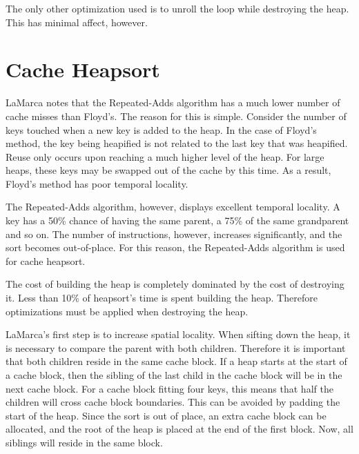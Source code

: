 The only other optimization used is to unroll the loop while destroying the
heap. This has minimal affect, however.

\section{Cache Heapsort}
\label{cache heapsort}
LaMarca notes that the Repeated-Adds algorithm has a much lower number of cache
misses than Floyd's. The reason for this is simple. Consider the number of keys 
touched when a new key is added to the heap. In the case of Floyd's method, the
key being heapified is not related to the last key that was heapified. Reuse
only occurs upon reaching a much higher level of the heap. For large heaps, these
keys may be swapped out of the cache by this time. As a result, Floyd's method
has poor temporal locality.

The Repeated-Adds algorithm, however, displays excellent temporal locality. A
key has a 50\% chance of having the same parent, a 75\% of the same grandparent
and so on. The number of instructions, however, increases significantly, and the
sort becomes out-of-place. For this reason, the Repeated-Adds algorithm is used
for cache heapsort.

The cost of building the heap is completely dominated by the cost of
destroying it. Less than 10\% of heapsort's time is spent building the heap.
Therefore optimizations must be applied when destroying the heap.

LaMarca's first step is to increase spatial locality. When sifting down the
heap, it is necessary to compare the parent with both children. Therefore it is
important that both children reside in the same cache block. If a heap starts at
the start of a cache block, then the sibling of the last child in the cache
block will be in the next cache block.  For a cache block fitting four keys,
this means that half the children will cross cache block boundaries. This can be
avoided by padding the start of the heap. Since the sort is out of place, an
extra cache block can be allocated, and the root of the heap is placed at the end of
the first block. Now, all siblings will reside in the same block.

\begin{figure}[h]
\centering
{}
\end{figure}

